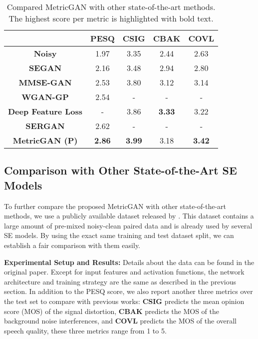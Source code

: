 \documentclass{article}
\begin{document}
\begin{table}[t]
\caption{Compared MetricGAN with other state-of-the-art methods. The highest score per metric is highlighted with bold text.}
\label{segan dataset}
\vskip 0.15in
\begin{center}
\begin{small}
\begin{tabular}{c||c||ccc}
\toprule
 & \textbf{PESQ} & CSIG & CBAK & COVL  \\
\hline
\textbf{Noisy}              & 1.97 & 3.35 & 2.44 & 2.63 \\
\textbf{SEGAN}              & 2.16 & 3.48 & 2.94 & 2.80 \\
\textbf{MMSE-GAN}          & 2.53 & 3.80 & 3.12 & 3.14 \\
\textbf{WGAN-GP}          & 2.54 & - & - & - \\
\textbf{Deep Feature Loss}                & - & 3.86 & \textbf{3.33} & 3.22 \\
\textbf{SERGAN}                & 2.62 & - & - & - \\
\hline
\textbf{MetricGAN (P)}      & \textbf{2.86} & \textbf{3.99} & 3.18 & \textbf{3.42} \\
\bottomrule
\end{tabular}
\end{small}
\end{center}
\vskip -0.1in
\end{table}









\subsection{Comparison with Other State-of-the-Art SE Models}
To further compare the proposed MetricGAN with other state-of-the-art methods, we use a publicly available dataset released by \cite{valentini2016investigating}. This dataset contains a large amount of pre-mixed noisy-clean paired data and is already used by several SE models. By using the exact same training and test dataset split, we can establish a fair comparison with them easily.

\textbf{Experimental Setup and Results:} Details about the data can be found in the original paper. Except for input features and activation functions, the network architecture and training strategy are the same as described in the previous section. In addition to the PESQ score, we also report another three metrics over the test set to compare with previous works: \textbf{CSIG} predicts the mean opinion score
(MOS) of the signal distortion, \textbf{CBAK} predicts the MOS of the background noise interferences, and \textbf{COVL} predicts the MOS of the overall speech quality, these three metrics range from 1 to 5.
\end{document}
